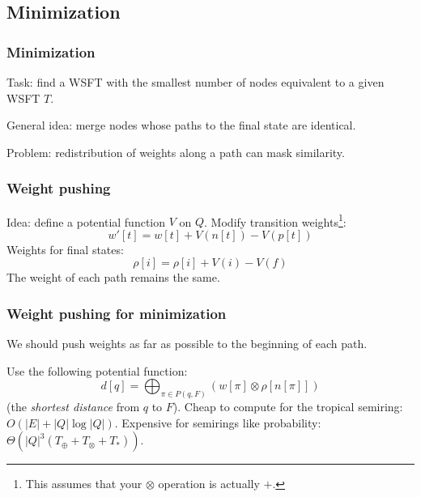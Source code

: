 \documentclass{beamer}
\newcommand{\<}{\langle}
\renewcommand{\>}{\rangle}
\begin{document}


\subsection{Minimization}

\begin{frame}
  \frametitle{Minimization}

  Task: find a WSFT with the smallest number of nodes equivalent to a
  given WSFT $T$.

  General idea: merge nodes whose paths to the final state are
  identical.

  Problem: redistribution of weights along a path can mask similarity.
\end{frame}

\begin{frame}
  \frametitle{Weight pushing}

  Idea: define a potential function $V$ on $Q$. Modify transition
  weights\footnote{This assumes that your $\otimes$ operation is
    actually $+$.}:
  $$
  w'[t] = w[t] + V(n[t]) - V(p[t])
  $$
  Weights for final states:
  $$
  \rho[i] = \rho[i] + V(i) - V(f)
  $$
  The weight of each path remains the same.
\end{frame}

\begin{frame}
  \frametitle{Weight pushing for minimization}

  We should push weights as far as possible to the beginning of each
  path.

  Use the following potential function:
  $$
  d[q] = \bigoplus_{\pi \in P(q,F)} (w[\pi] \otimes \rho[n[\pi]])
  $$
  (the {\em shortest distance} from $q$ to $F$). Cheap to compute for
  the tropical semiring: $O(|E| + |Q|\log|Q|)$. Expensive for
  semirings like probability: $\Theta(|Q|^3(T_\oplus + T_\otimes + T_*))$.
\end{frame}
\end{document}
